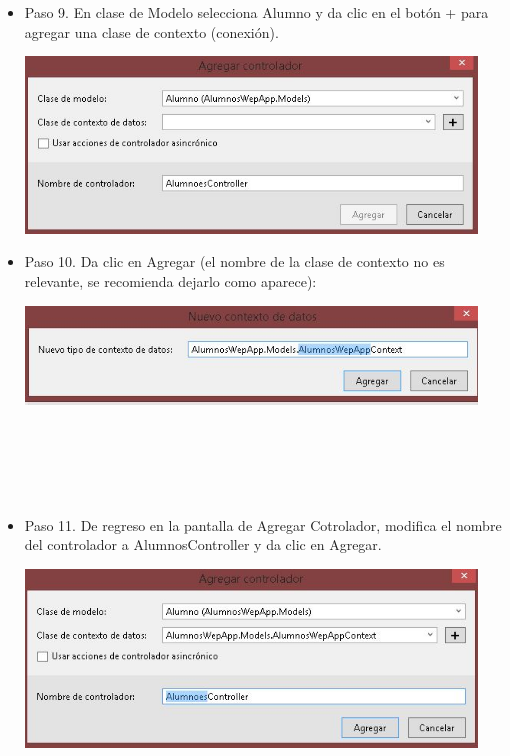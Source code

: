 \begin{flushleft}
\begin{itemize}
\item Paso 9. En clase de Modelo selecciona Alumno y da clic en el botón + para agregar una clase de contexto
(conexión).
\begin{center}
	\includegraphics[width=12cm]{./Imagenes/paso9} 
	\end{center}

\item Paso 10. Da clic en Agregar (el nombre de la clase de contexto no es relevante, se recomienda dejarlo
como aparece): 
\begin{center}
	\includegraphics[width=12cm]{./Imagenes/paso10} 
	\end{center}

\textbf{ }\\
\textbf{ }\\
\textbf{ }\\
\textbf{ }\\
\item Paso 11. De regreso en la pantalla de Agregar Cotrolador, modifica el nombre del controlador a
AlumnosController y da clic en Agregar.
\begin{center}
	\includegraphics[width=12cm]{./Imagenes/paso11} 
	\end{center}


\end{itemize}
\end{flushleft}

